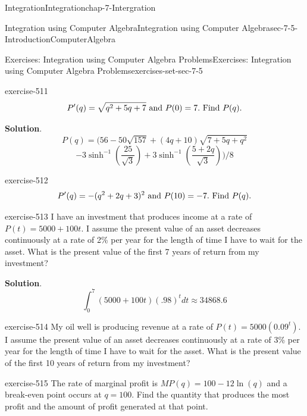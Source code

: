 \documentclass[oneside,10pt,]{book}
\numberwithin{equation}{section}
\begin{document}
\begin{chapterptx}{Integration}{}{Integration}{}{}{chap-7-Intergration}
\begin{sectionptx}{Integration using Computer Algebra}{}{Integration using Computer Algebra}{}{}{sec-7-5-IntroductionComputerAlgebra}
\begin{exercises-subsection-numberless}{Exercises: Integration using Computer Algebra Problems}{}{Exercises: Integration using Computer Algebra Problems}{}{}{exercises-set-sec-7-5}
\begin{divisionexercise}{19}{}{}{exercise-511}
%
\begin{equation*}
P' (q)=\sqrt{q^2+5q+7} \hbox{ and } P(0)=7.  \hbox{ Find } P(q).
\end{equation*}
\par\smallskip%
\noindent\textbf{Solution}.\hypertarget{solution-259}{}\quad%
%
\begin{equation*}
P(q) = (56 - 50 \sqrt{157} + (4q+10) \sqrt{7 + 5 q + q^2} 
\end{equation*}
%
\begin{equation*}
- 3 \sinh^{-1}\left(\frac{25}{\sqrt{3}}\right)+ 3 \sinh^{-1}\left(\frac{5 + 2 q}{\sqrt{3}}\right))/8
\end{equation*}
\end{divisionexercise}%
\begin{divisionexercise}{20}{}{}{exercise-512}%
%
\begin{equation*}
P' (q)=-(q^2+2q+3)^2 \hbox{ and } P(10)=-7.  \hbox{ Find } P(q).
\end{equation*}
\end{divisionexercise}%
\begin{divisionexercise}{21}{}{}{exercise-513}%
\hypertarget{p-2920}{}%
I have an investment that produces income at a rate of \(P(t)=5000+100t\).  I assume the present value of an asset decreases continuously at a rate of 2\% per year for the length of time I have to wait for the asset.  What is the present value of the first 7 years of return from my investment?%
\par\smallskip%
\noindent\textbf{Solution}.\hypertarget{solution-260}{}\quad%
%
\begin{equation*}
\int_0^7(5000+100t) (.98)^t dt\approx 34868.6
\end{equation*}
\end{divisionexercise}%
\begin{divisionexercise}{22}{}{}{exercise-514}%
\hypertarget{p-2921}{}%
My oil well is producing revenue at a rate of \(P(t)=5000(0.09^t)\).  I assume the present value of an asset decreases continuously at a rate of 3\% per year for the length of time I have to wait for the asset.  What is the present value of the first 10 years of return from my investment?%
\end{divisionexercise}%
\begin{divisionexercise}{23}{}{}{exercise-515}%
\hypertarget{p-2922}{}%
The rate of marginal profit is \(MP(q)=100-12\ln(q)\) and a break-even point occurs at \(q=100\). Find the quantity that produces the most profit and the amount of profit generated at that point.%

\end{divisionexercise}
\end{exercises-subsection-numberless}
\end{sectionptx}
\end{chapterptx}
\end{document}
